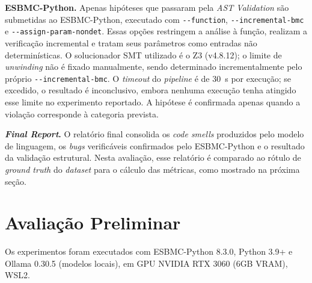 \documentclass[sigconf]{acmart}
\begin{document}

\textbf{ESBMC-Python.}
Apenas hipóteses que passaram pela \textit{AST Validation} são submetidas ao ESBMC-Python, executado com \nolinkurl{--function}, \nolinkurl{--incremental-bmc} e \nolinkurl{--assign-param-nondet}. Essas opções restringem a análise à função, realizam a verificação incremental e tratam seus parâmetros como entradas não determinísticas. O solucionador SMT utilizado é o Z3 (v4.8.12); o limite de \textit{unwinding} não é fixado manualmente, sendo determinado incrementalmente pelo próprio \nolinkurl{--incremental-bmc}. O \textit{timeout} do \textit{pipeline} é de 30~s por execução; se excedido, o resultado é inconclusivo, embora nenhuma execução tenha atingido esse limite no experimento reportado. A hipótese é confirmada apenas quando a violação corresponde à categoria prevista.



\textbf{\textit{Final Report}.}
O relatório final consolida os \textit{code smells} produzidos pelo modelo de linguagem, os \textit{bugs} verificáveis confirmados pelo ESBMC-Python e o resultado da validação estrutural. Nesta avaliação, esse relatório é comparado ao rótulo de \textit{ground truth} do \textit{dataset} para o cálculo das métricas, como mostrado na próxima seção.




\section{Avaliação Preliminar}

Os experimentos foram executados com ESBMC-Python 8.3.0, Python 3.9+ e Ollama 0.30.5 (modelos locais), em GPU NVIDIA RTX 3060 (6GB VRAM), WSL2.
\end{document}
